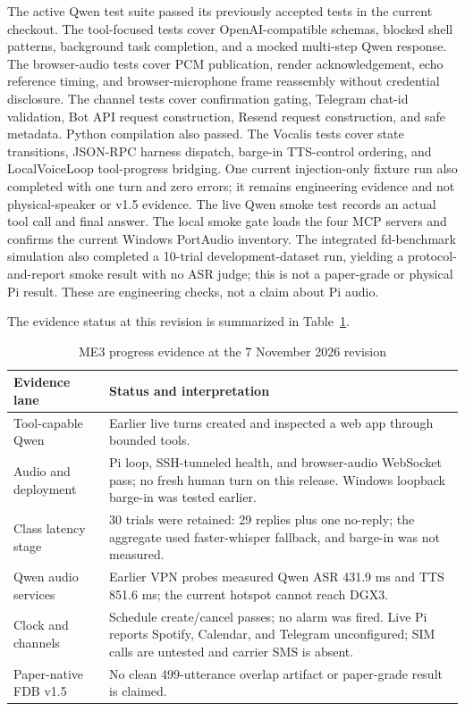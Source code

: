 \documentclass[sigconf,nonacm,balance=false]{acmart}
\begin{document}
The active Qwen test suite passed its previously accepted tests in the current
checkout. The tool-focused tests cover OpenAI-compatible schemas, blocked shell
patterns, background task completion, and a mocked multi-step Qwen response.
The browser-audio tests cover PCM publication, render acknowledgement, echo
reference timing, and browser-microphone frame reassembly without credential
disclosure. The channel tests cover confirmation gating, Telegram
chat-id validation, Bot API request construction, Resend request construction,
and safe metadata. Python compilation also passed.
The Vocalis tests cover state transitions, JSON-RPC harness dispatch,
barge-in TTS-control ordering, and LocalVoiceLoop tool-progress bridging.
One current injection-only fixture run also completed with one turn and zero
errors; it remains engineering evidence and not physical-speaker or v1.5
evidence.
The live Qwen smoke test records an actual tool call and final answer. The
local smoke gate loads the four MCP servers and confirms the current Windows
PortAudio inventory. The integrated fd-benchmark simulation also completed a
10-trial development-dataset run, yielding a protocol-and-report smoke result
with no ASR judge; this is not a paper-grade or physical Pi result. These are
engineering checks, not a claim about Pi audio.

The evidence status at this revision is summarized in
Table~\ref{tab:progress}.

\begin{table}[t]
\caption{ME3 progress evidence at the 7 November 2026 revision}
\label{tab:progress}
\scriptsize
\begin{tabularx}{\textwidth}{@{}p{}X@{}}
\toprule
Evidence lane & Status and interpretation \\
\midrule
Tool-capable Qwen & Earlier live turns created and inspected a web app through bounded tools. \\
Audio and deployment & Pi loop, SSH-tunneled health, and browser-audio WebSocket pass; no fresh human turn on this release. Windows loopback barge-in was tested earlier. \\
Class latency stage & 30 trials were retained: 29 replies plus one no-reply; the aggregate used faster-whisper fallback, and barge-in was not measured. \\
Qwen audio services & Earlier VPN probes measured Qwen ASR 431.9 ms and TTS 851.6 ms; the current hotspot cannot reach DGX3. \\
Clock and channels & Schedule create/cancel passes; no alarm was fired. Live Pi reports Spotify, Calendar, and Telegram unconfigured; SIM calls are untested and carrier SMS is absent. \\
Paper-native FDB v1.5 & No clean 499-utterance overlap artifact or paper-grade result is claimed. \\
\bottomrule
\end{tabularx}
\end{table}
\end{document}
